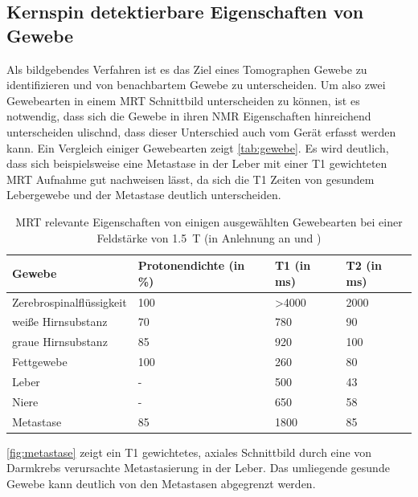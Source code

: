 


\subsection{Kernspin detektierbare Eigenschaften von Gewebe}
Als bildgebendes Verfahren ist es das Ziel eines Tomographen Gewebe zu identifizieren und von benachbartem Gewebe zu unterscheiden. Um also zwei Gewebearten in einem MRT Schnittbild unterscheiden zu können, ist es notwendig, dass sich die Gewebe in ihren NMR Eigenschaften hinreichend unterscheiden ulischnd, dass dieser Unterschied auch vom Gerät erfasst werden kann. Ein Vergleich einiger Gewebearten zeigt \autoref{tab:gewebe}. Es wird deutlich, dass sich beispielsweise eine Metastase in der Leber mit einer T1 gewichteten MRT Aufnahme gut nachweisen lässt, da sich die T1 Zeiten von gesundem Lebergewebe und der Metastase deutlich unterscheiden.

\begin{table}[H]
	\centering
	\caption[MRT relevante Eigenschaften ausgewählter Gewebe]{MRT relevante Eigenschaften von einigen ausgewählten Gewebearten bei einer Feldstärke von \SI{1.5}{\tesla} (in Anlehnung an \cite[S.~16]{Weishaupt2014} und \cite[S.~17]{Reiser2008})}
	\label{tab:gewebe}
	\begin{tabular}{llll}
		\toprule
		\textbf{Gewebe} & \textbf{Protonendichte (in \%)} & \textbf{T1 (in ms)} & \textbf{T2 (in ms)} \\
		\midrule
		Zerebrospinalflüssigkeit & 100 & \textgreater4000 & 2000 \\
		weiße Hirnsubstanz & 70 & 780 & 90 \\
		graue Hirnsubstanz & 85 & 920 & 100 \\
		Fettgewebe & 100 & 260 & 80 \\
		Leber & - & 500 & 43 \\
		Niere & - & 650 & 58 \\
		Metastase & 85 & 1800 & 85 \\
		\bottomrule
	\end{tabular}
\end{table}

\autoref{fig:metastase} zeigt ein T1 gewichtetes, axiales Schnittbild durch eine von Darmkrebs verursachte Metastasierung in der Leber. Das umliegende gesunde Gewebe kann deutlich von den Metastasen abgegrenzt werden.


